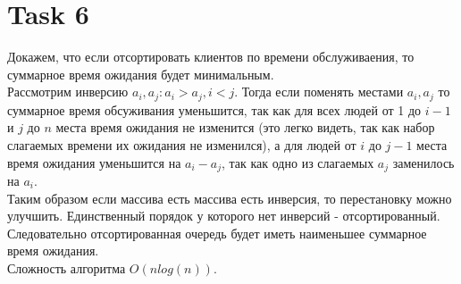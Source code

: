 \documentclass[12pt]{exam}
\begin{document}
\section*{Task 6}
Докажем, что если отсортировать клиентов по времени обслуживаения, 
то суммарное время ожидания будет минимальным. \\
Рассмотрим инверсию $a_i, a_j: a_i > a_j, i < j$. 
Тогда если поменять местами $a_i, a_j$ 
то суммарное время обсуживания уменьшится, 
так как для всех людей от 1 до $i - 1$ и  $j$ до $n$ места время ожидания не изменится
(это легко видеть, так как набор слагаемых времени их ожидания не изменился), 
а для людей от $i$ до $j - 1$ места время ожидания уменьшится на $a_i - a_j$, 
так как одно из слагаемых $a_j$ заменилось на $a_i$. \\
Таким образом если массива есть массива есть инверсия, то перестановку можно улучшить.
Единственный порядок у которого нет инверсий - отсортированный. \\
Следовательно отсортированная очередь будет иметь наименьшее суммарное время ожидания. \\
Сложность алгоритма $O(n log(n))$.
\end{document}
